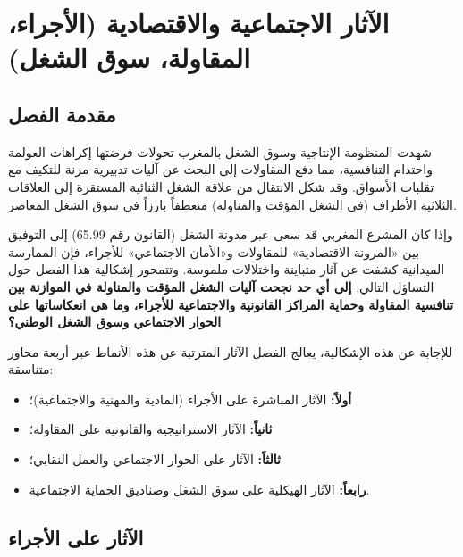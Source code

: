 
\chapter{الآثار الاجتماعية والاقتصادية (الأجراء، المقاولة، سوق الشغل)}
\label{chap:chapitre7}

\section*{مقدمة الفصل}

شهدت المنظومة الإنتاجية وسوق الشغل بالمغرب تحولات فرضتها إكراهات العولمة واحتدام التنافسية، مما دفع المقاولات إلى البحث عن آليات تدبيرية مرنة للتكيف مع تقلبات الأسواق. وقد شكل الانتقال من علاقة الشغل الثنائية المستقرة إلى العلاقات الثلاثية الأطراف (في الشغل المؤقت والمناولة) منعطفاً بارزاً في سوق الشغل المعاصر.

وإذا كان المشرع المغربي قد سعى عبر مدونة الشغل (القانون رقم \textenglish{65.99}) إلى التوفيق بين «المرونة الاقتصادية» للمقاولات و«الأمان الاجتماعي» للأجراء، فإن الممارسة الميدانية كشفت عن آثار متباينة واختلالات ملموسة. وتتمحور إشكالية هذا الفصل حول التساؤل التالي: \textbf{إلى أي حد نجحت آليات الشغل المؤقت والمناولة في الموازنة بين تنافسية المقاولة وحماية المراكز القانونية والاجتماعية للأجراء، وما هي انعكاساتها على الحوار الاجتماعي وسوق الشغل الوطني؟}

للإجابة عن هذه الإشكالية، يعالج الفصل الآثار المترتبة عن هذه الأنماط عبر أربعة محاور متناسقة:
\begin{itemize}[leftmargin=*, itemsep=4pt]
    \item \textbf{أولاً:} الآثار المباشرة على الأجراء (المادية والمهنية والاجتماعية)؛
    \item \textbf{ثانياً:} الآثار الاستراتيجية والقانونية على المقاولة؛
    \item \textbf{ثالثاً:} الآثار على الحوار الاجتماعي والعمل النقابي؛
    \item \textbf{رابعاً:} الآثار الهيكلية على سوق الشغل وصناديق الحماية الاجتماعية.
\end{itemize}

\section{الآثار على الأجراء}


